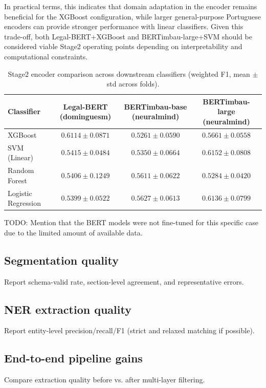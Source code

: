 \documentclass[preprint,a4paper,fleqn]{cas-dc}
\begin{document}
In practical terms, this indicates that domain adaptation in the encoder remains beneficial for the XGBoost configuration, while larger general-purpose Portuguese encoders can provide stronger performance with linear classifiers. Given this trade-off, both Legal-BERT+XGBoost and BERTimbau-large+SVM should be considered viable Stage2 operating points depending on interpretability and computational constraints.

\begin{table}[t]
\centering
\caption{Stage2 encoder comparison across downstream classifiers (weighted F1, mean $\pm$ std across folds).}
\label{tab:encoder_comparison}
\begin{tabular}{lccc}
\toprule
Classifier & Legal-BERT (dominguesm) & BERTimbau-base (neuralmind) & BERTimbau-large (neuralmind) \\
\midrule
XGBoost & $0.6114 \pm 0.0871$ & $0.5261 \pm 0.0590$ & $0.5661 \pm 0.0558$ \\
SVM (Linear) & $0.5415 \pm 0.0484$ & $0.5350 \pm 0.0664$ & $\mathbf{0.6152 \pm 0.0808}$ \\
Random Forest & $0.5406 \pm 0.1249$ & $0.5611 \pm 0.0622$ & $0.5284 \pm 0.0420$ \\
Logistic Regression & $0.5399 \pm 0.0522$ & $0.5627 \pm 0.0613$ & $0.6136 \pm 0.0799$ \\
\bottomrule
\end{tabular}
\end{table}

TODO: Mention that the BERT models were not fine-tuned for this specific case due to the limited amount of available data.

\subsection{Segmentation quality}
Report schema-valid rate, section-level agreement, and representative errors.

\subsection{NER extraction quality}
Report entity-level precision/recall/F1 (strict and relaxed matching if possible).

\subsection{End-to-end pipeline gains}
Compare extraction quality before vs. after multi-layer filtering.
\end{document}
